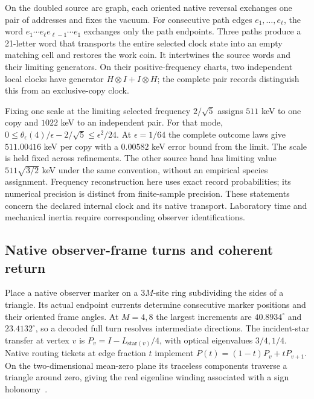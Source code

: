 On the doubled source arc graph, each oriented native reversal exchanges
one pair of addresses and fixes the vacuum. For consecutive path edges
$e_1,\ldots,e_\ell$, the word $e_1\cdots e_\ell e_{\ell-1}\cdots e_1$
exchanges only the path endpoints. Three paths produce a 21-letter word that transports the entire
selected clock state into an empty matching cell and restores the work coin.
It intertwines the source words and their limiting generators. On their
positive-frequency charts, two independent local clocks have generator
$H\otimes I+I\otimes H$; the
complete pair records distinguish this from an exclusive-copy clock.

Fixing one scale at the limiting selected frequency $2/\sqrt5$ assigns
$511$ keV to one copy and $1022$ keV to an independent pair. For that mode,
$0\leq\theta_\epsilon(4)/\epsilon-2/\sqrt5\leq\epsilon^2/24$.
At $\epsilon=1/64$ the complete outcome laws give $511.00416$ keV per copy
with a $0.00582$ keV error bound from the limit. The scale is held fixed
across refinements. The other source band has limiting value
$511\sqrt{3/2}$ keV under the same convention, without an empirical species
assignment. Frequency reconstruction here uses exact record probabilities;
its numerical precision is distinct from finite-sample precision. These
statements concern the declared internal clock and its native transport.
Laboratory time and mechanical inertia require corresponding observer
identifications.

\subsection{Native observer-frame turns and coherent return}
\label{subsec:native-observer-frame-holonomy}

Place a native observer marker on a $3M$-site ring subdividing the sides of
a triangle. Its actual endpoint currents determine consecutive marker
positions and their oriented frame angles. At $M=4,8$ the largest increments
are $40.8934^\circ$ and $23.4132^\circ$, so a decoded full turn resolves
intermediate directions. The incident-star transfer at vertex $v$ is
$P_v=I-L_{\mathrm{star}(v)}/4$, with optical eigenvalues $3/4,1/4$.
Native routing tickets at edge fraction $t$ implement
$P(t)=(1-t)P_v+tP_{v+1}$. On the two-dimensional mean-zero plane its
traceless components traverse a triangle around zero, giving the real
eigenline winding associated with a sign holonomy~\cite{berry1984quantal}.

